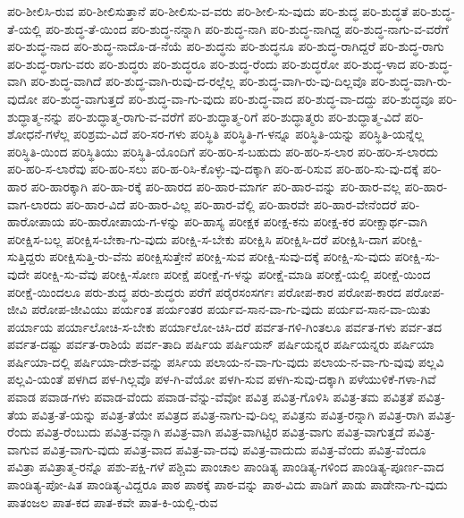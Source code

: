 {ಪರಿ-ಶೀಲಿಸಿ-ರುವ
ಪರಿ-ಶೀಲಿಸುತ್ತಾನೆ
ಪರಿ-ಶೀಲಿಸು-ವ-ವರು
ಪರಿ-ಶೀಲಿ-ಸು-ವುದು
ಪರಿ-ಶುದ್ಧ
ಪರಿ-ಶುದ್ಧತೆ
ಪರಿ-ಶುದ್ಧ-ತೆ-ಯಲ್ಲಿ
ಪರಿ-ಶುದ್ಧ-ತೆ-ಯಿಂದ
ಪರಿ-ಶುದ್ಧ-ನನ್ನಾಗಿ
ಪರಿ-ಶುದ್ಧ-ನಾಗಿ
ಪರಿ-ಶುದ್ಧ-ನಾಗಿದ್ದ
ಪರಿ-ಶುದ್ಧ-ನಾಗು-ವ-ವರೆಗೆ
ಪರಿ-ಶುದ್ಧ-ನಾದ
ಪರಿ-ಶುದ್ಧ-ನಾದೊ-ಡ-ನೆಯೆ
ಪರಿ-ಶುದ್ಧನು
ಪರಿ-ಶುದ್ಧನೂ
ಪರಿ-ಶುದ್ಧ-ರಾಗಿದ್ದರೆ
ಪರಿ-ಶುದ್ಧ-ರಾಗು
ಪರಿ-ಶುದ್ಧ-ರಾಗು-ವರು
ಪರಿ-ಶುದ್ಧರು
ಪರಿ-ಶುದ್ಧರೂ
ಪರಿ-ಶುದ್ಧ-ರೆಂದು
ಪರಿ-ಶುದ್ಧರೋ
ಪರಿ-ಶುದ್ಧ-ಳಾದ
ಪರಿ-ಶುದ್ಧ-ವಾಗಿ
ಪರಿ-ಶುದ್ಧ-ವಾಗಿದೆ
ಪರಿ-ಶುದ್ಧ-ವಾಗಿ-ರುವು-ದ-ರಲ್ಲೆಲ್ಲ
ಪರಿ-ಶುದ್ಧ-ವಾಗಿ-ರು-ವು-ದಿಲ್ಲವೊ
ಪರಿ-ಶುದ್ಧ-ವಾಗಿ-ರು-ವುದೋ
ಪರಿ-ಶುದ್ಧ-ವಾಗುತ್ತದೆ
ಪರಿ-ಶುದ್ಧ-ವಾ-ಗು-ವುದು
ಪರಿ-ಶುದ್ಧ-ವಾದ
ಪರಿ-ಶುದ್ಧ-ವಾ-ದದ್ದು
ಪರಿ-ಶುದ್ಧವೂ
ಪರಿ-ಶುದ್ಧಾತ್ಮ-ನನ್ನು
ಪರಿ-ಶುದ್ಧಾತ್ಮ-ರಾಗು-ವ-ವರೆಗೆ
ಪರಿ-ಶುದ್ಧಾತ್ಮ-ರಿಗೆ
ಪರಿ-ಶುದ್ಧಾತ್ಮರು
ಪರಿ-ಶುದ್ಧಾತ್ಮ-ವಿದೆ
ಪರಿ-ಶೋಧನೆ-ಗಳೆಲ್ಲ
ಪರಿಶ್ರಮ-ವಿದೆ
ಪರಿ-ಸರ-ಗಳು
ಪರಿಸ್ಥಿತಿ
ಪರಿಸ್ಥಿತಿ-ಗ-ಳನ್ನೂ
ಪರಿಸ್ಥಿತಿ-ಯನ್ನು
ಪರಿಸ್ಥಿತಿ-ಯನ್ನೆಲ್ಲ
ಪರಿಸ್ಥಿತಿ-ಯಿಂದ
ಪರಿಸ್ಥಿತಿಯು
ಪರಿಸ್ಥಿತಿ-ಯೊಂದಿಗೆ
ಪರಿ-ಹರಿ-ಸ-ಬಹುದು
ಪರಿ-ಹರಿ-ಸ-ಲಾರ
ಪರಿ-ಹರಿ-ಸ-ಲಾರದು
ಪರಿ-ಹರಿ-ಸ-ಲಾರೆವು
ಪರಿ-ಹರಿ-ಸಲು
ಪರಿ-ಹ-ರಿಸಿ-ಕೊಳ್ಳು-ವು-ದಕ್ಕಾಗಿ
ಪರಿ-ಹ-ರಿಸುವ
ಪರಿ-ಹರಿ-ಸು-ವು-ದಕ್ಕೆ
ಪರಿ-ಹಾರ
ಪರಿ-ಹಾರಕ್ಕಾಗಿ
ಪರಿ-ಹಾ-ರಕ್ಕೆ
ಪರಿ-ಹಾರದ
ಪರಿ-ಹಾರ-ಮಾರ್ಗ
ಪರಿ-ಹಾರ-ವನ್ನು
ಪರಿ-ಹಾರ-ವಲ್ಲ
ಪರಿ-ಹಾರ-ವಾಗ-ಲಾರದು
ಪರಿ-ಹಾರ-ವಿದೆ
ಪರಿ-ಹಾರ-ವಿಲ್ಲ
ಪರಿ-ಹಾರ-ವೆಲ್ಲಿ
ಪರಿ-ಹಾರವೇ
ಪರಿ-ಹಾರ-ವೇನೆಂದರೆ
ಪರಿ-ಹಾರೋಪಾಯ
ಪರಿ-ಹಾರೋಪಾಯ-ಗ-ಳನ್ನು
ಪರಿ-ಹಾಸ್ಯ
ಪರೀಕ್ಷಕ
ಪರೀಕ್ಷ-ಕನು
ಪರೀಕ್ಷ-ಕರ
ಪರೀಕ್ಷಾರ್ಥ-ವಾಗಿ
ಪರೀಕ್ಷಿಸ-ಬಲ್ಲ
ಪರೀಕ್ಷಿಸ-ಬೇಕಾ-ಗು-ವುದು
ಪರೀಕ್ಷಿ-ಸ-ಬೇಕು
ಪರೀಕ್ಷಿಸಿ
ಪರೀಕ್ಷಿಸಿ-ದರೆ
ಪರೀಕ್ಷಿಸಿ-ದಾಗ
ಪರೀಕ್ಷಿ-ಸುತ್ತಿದ್ದರು
ಪರೀಕ್ಷಿಸುತ್ತಿ-ರು-ವೆನು
ಪರೀಕ್ಷಿಸುತ್ತೇನೆ
ಪರೀಕ್ಷಿ-ಸುವ
ಪರೀಕ್ಷಿ-ಸುವು-ದಕ್ಕೆ
ಪರೀಕ್ಷಿ-ಸು-ವುದು
ಪರೀಕ್ಷಿ-ಸು-ವುದೇ
ಪರೀಕ್ಷಿ-ಸು-ವೆವು
ಪರೀಕ್ಷಿ-ಸೋಣ
ಪರೀಕ್ಷೆ
ಪರೀಕ್ಷೆ-ಗ-ಳನ್ನು
ಪರೀಕ್ಷೆ-ಮಾಡಿ
ಪರೀಕ್ಷೆ-ಯಲ್ಲಿ
ಪರೀಕ್ಷೆ-ಯಿಂದ
ಪರೀಕ್ಷೆ-ಯಿಂದಲೂ
ಪರು-ಶುದ್ಧ
ಪರು-ಶುದ್ಧರು
ಪರೆಗೆ
ಪರೈರಸಂಸರ್ಗಃ
ಪರೋಪ-ಕಾರ
ಪರೋಪ-ಕಾರದ
ಪರೋಪ-ಜೀವಿ
ಪರೋಪ-ಜೀವಿಯು
ಪರ್ಯಂತ
ಪರ್ಯಂತರ
ಪರ್ಯವ-ಸಾನ-ವಾ-ಗು-ವುದು
ಪರ್ಯವ-ಸಾನ-ವಾ-ಯಿತು
ಪರ್ಯಾಯ
ಪರ್ಯಾಲೋಚಿ-ಸ-ಬೇಕು
ಪರ್ಯಾಲೋ-ಚಿಸಿ-ದರೆ
ಪರ್ವತ-ಗಳಿ-ಗಿಂತಲೂ
ಪರ್ವತ-ಗಳು
ಪರ್ವ-ತದ
ಪರ್ವತ-ದಷ್ಟು
ಪರ್ವತ-ರಾಶಿಯೆ
ಪರ್ವ-ತಾದಿ
ಪರ್ಷಿಯ
ಪರ್ಷಿಯನ್
ಪರ್ಷಿಯನ್ನರ
ಪರ್ಷಿಯನ್ನರು
ಪರ್ಷಿಯಾ
ಪರ್ಷಿಯಾ-ದಲ್ಲಿ
ಪರ್ಷಿಯಾ-ದೇಶ-ವನ್ನು
ಪರ್ಸಿಯ
ಪಲಾಯ-ನ-ವಾ-ಗು-ವುದು
ಪಲಾಯ-ನ-ವಾ-ಗು-ವುವು
ಪಲ್ಲವಿ
ಪಲ್ಲವಿ-ಯಂತೆ
ಪಳಗಿದ
ಪಳ-ಗಿಲ್ಲವೊ
ಪಳ-ಗಿ-ವೆಯೋ
ಪಳಗಿ-ಸುವ
ಪಳಗಿ-ಸುವು-ದಕ್ಕಾಗಿ
ಪಳೆಯುಳಿಕೆ-ಗಳಾ-ಗಿವೆ
ಪವಾಡ
ಪವಾಡ-ಗಳು
ಪವಾಡ-ವೆಂದು
ಪವಾಡ-ವೆನ್ನು-ವೆವೋ
ಪವಿತ್ರ
ಪವಿತ್ರ-ಗೊಳಿಸಿ
ಪವಿತ್ರ-ತಮ
ಪವಿತ್ರತೆ
ಪವಿತ್ರ-ತೆಯ
ಪವಿತ್ರ-ತೆ-ಯನ್ನು
ಪವಿತ್ರ-ತೆಯೇ
ಪವಿತ್ರದ
ಪವಿತ್ರ-ನಾಗು-ವು-ದಿಲ್ಲ
ಪವಿತ್ರನು
ಪವಿತ್ರ-ರನ್ನಾಗಿ
ಪವಿತ್ರ-ರಾಗಿ
ಪವಿತ್ರ-ರೆಂದು
ಪವಿತ್ರ-ರೆಂಬುದು
ಪವಿತ್ರ-ವನ್ನಾಗಿ
ಪವಿತ್ರ-ವಾಗಿ
ಪವಿತ್ರ-ವಾಗಿಟ್ಟಿರ
ಪವಿತ್ರ-ವಾಗು
ಪವಿತ್ರ-ವಾಗುತ್ತದೆ
ಪವಿತ್ರ-ವಾಗುವ
ಪವಿತ್ರ-ವಾಗು-ವುದು
ಪವಿತ್ರ-ವಾದ
ಪವಿತ್ರ-ವಾ-ದವು
ಪವಿತ್ರ-ವಾದುದು
ಪವಿತ್ರ-ವೆಂದು
ಪವಿತ್ರ-ವೆಂದೂ
ಪವಿತ್ರಾ
ಪವಿತ್ರಾತ್ಮ-ರನ್ನೊ
ಪಶು-ಪಕ್ಷಿ-ಗಳೆ
ಪಶ್ಚಿಮ
ಪಾಂಚಾಲ
ಪಾಂಡಿತ್ಯ
ಪಾಂಡಿತ್ಯ-ಗಳಿಂದ
ಪಾಂಡಿತ್ಯ-ಪೂರ್ಣ-ವಾದ
ಪಾಂಡಿತ್ಯ-ಪೋ-ಷಿತ
ಪಾಂಡಿತ್ಯ-ವಿದ್ದರೂ
ಪಾಠ
ಪಾಠಕ್ಕೆ
ಪಾಠ-ವನ್ನು
ಪಾಠ-ವಿದು
ಪಾಡಿಗೆ
ಪಾಡು
ಪಾಡೇನಾ-ಗು-ವುದು
ಪಾತಂಜಲ
ಪಾತ-ಕದ
ಪಾತ-ಕವೇ
ಪಾತ-ಕಿ-ಯಲ್ಲಿ-ರುವ
}
